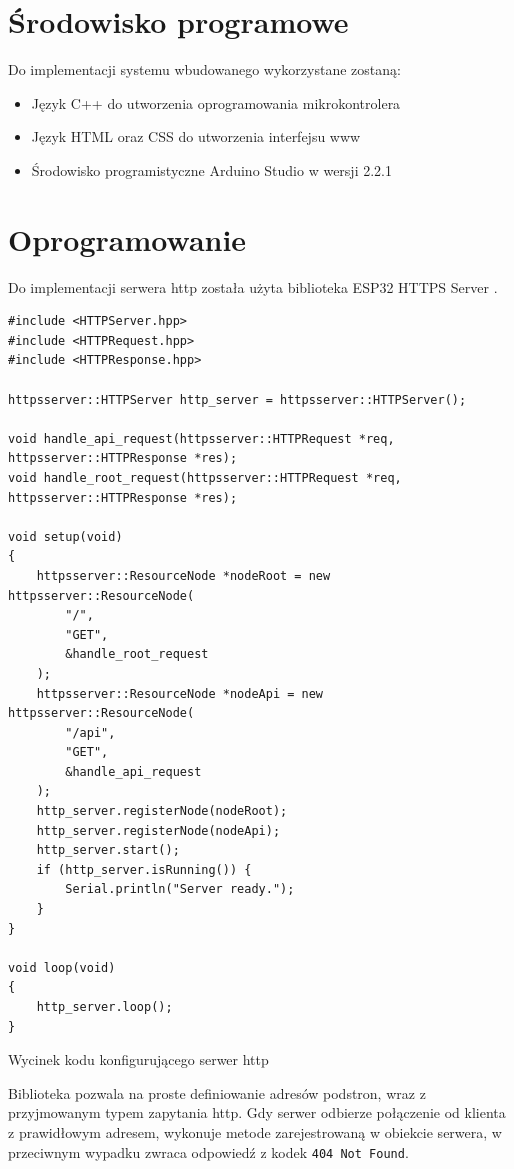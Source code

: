 \documentclass[12pt,a4paper]{article}
\begin{document}
\section{Środowisko programowe}
Do implementacji systemu wbudowanego wykorzystane zostaną:
\begin{itemize}
    \item Język C++ do utworzenia oprogramowania mikrokontrolera
    \item Język HTML oraz CSS do utworzenia interfejsu www
    \item Środowisko programistyczne Arduino Studio w wersji 2.2.1
\end{itemize}

\section{Oprogramowanie}

Do implementacji serwera http została użyta biblioteka ESP32 HTTPS Server \cite{esp32-https-server-library}. 

\begin{code}[H]
\begin{verbatim}
#include <HTTPServer.hpp>
#include <HTTPRequest.hpp>
#include <HTTPResponse.hpp>

httpsserver::HTTPServer http_server = httpsserver::HTTPServer();

void handle_api_request(httpsserver::HTTPRequest *req, httpsserver::HTTPResponse *res);
void handle_root_request(httpsserver::HTTPRequest *req, httpsserver::HTTPResponse *res);

void setup(void)
{
    httpsserver::ResourceNode *nodeRoot = new httpsserver::ResourceNode(
        "/", 
        "GET", 
        &handle_root_request
    );
    httpsserver::ResourceNode *nodeApi = new httpsserver::ResourceNode(
        "/api", 
        "GET", 
        &handle_api_request
    );
    http_server.registerNode(nodeRoot);
    http_server.registerNode(nodeApi);
    http_server.start();
    if (http_server.isRunning()) {
        Serial.println("Server ready.");
    }
}

void loop(void)
{
    http_server.loop();
}
\end{verbatim}
\caption{Wycinek kodu konfigurującego serwer http}
\label{http-server-code-parts}
\end{code}

Biblioteka pozwala na proste definiowanie adresów podstron, wraz z przyjmowanym typem zapytania http. Gdy serwer odbierze połączenie od klienta z prawidłowym adresem, wykonuje metode zarejestrowaną w obiekcie serwera, w przeciwnym wypadku zwraca odpowiedź z kodek \texttt{404 Not Found}.
\end{document}
